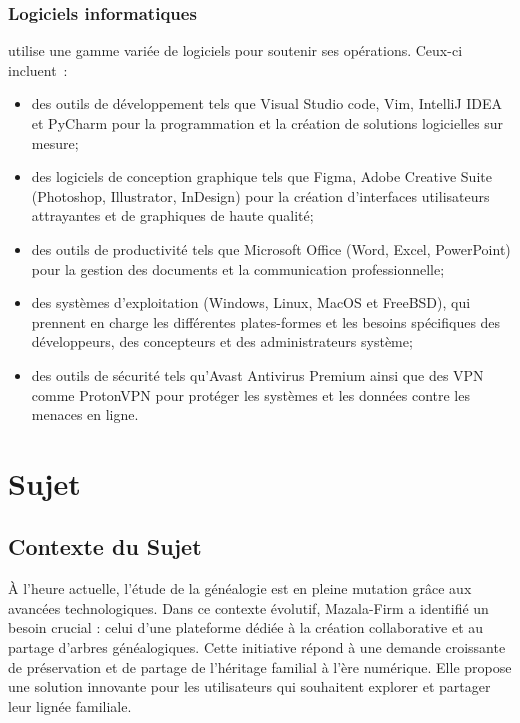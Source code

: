 \subsubsection   { Logiciels informatiques }
\firm utilise une gamme variée de logiciels pour soutenir ses opérations. Ceux-ci incluent :
\begin{itemize}

  \item des outils de développement tels que Visual Studio code, Vim, IntelliJ IDEA et
    PyCharm pour la programmation et la création de solutions logicielles sur mesure;

  \item des logiciels de conception graphique tels que Figma, Adobe Creative Suite
    (Photoshop, Illustrator, InDesign) pour la création d’interfaces utilisateurs
    attrayantes et de graphiques de haute qualité;

  \item des outils de productivité tels que Microsoft Office (Word, Excel, PowerPoint)
    pour la gestion des documents et la communication professionnelle;

  \item des systèmes d’exploitation  (Windows, Linux, MacOS et FreeBSD), qui prennent en charge
    les différentes plates-formes et les besoins spécifiques des développeurs,
    des concepteurs et des administrateurs système;

  \item des outils de sécurité tels qu’Avast Antivirus Premium ainsi que des VPN comme ProtonVPN
    pour protéger les systèmes et les données contre les menaces en ligne.

\end{itemize}

\newpage


\section{Sujet}
\subsection{Contexte du Sujet}

À l'heure actuelle, l'étude de la généalogie est en pleine mutation grâce aux
avancées technologiques. Dans ce contexte évolutif, Mazala-Firm a identifié un
besoin crucial : celui d'une plateforme dédiée à la création collaborative et au
partage d'arbres généalogiques. Cette initiative répond à une demande croissante de
préservation et de partage de l’héritage familial à l’ère numérique. Elle
propose une solution innovante pour les utilisateurs qui souhaitent explorer et
partager leur lignée familiale.


